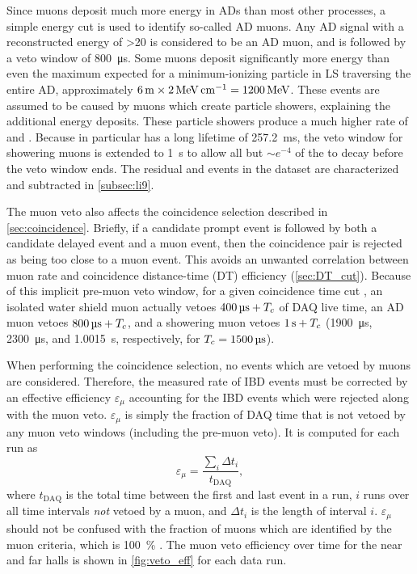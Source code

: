 Since muons deposit much more energy in ADs than most other processes,
a simple energy cut is used to identify so-called AD muons.
Any AD signal with a reconstructed energy of \SI{>20}{\mev}
is considered to be an AD muon, and is followed by a veto window
of \SI{800}{\micro\second}.
Some muons deposit significantly more energy than
even the maximum expected for a minimum-ionizing particle in LS
traversing the entire AD, approximately
$\SI{6}{\meter}\times\SI{2}{\mev\per\cm}=\SI{1200}{\mev}$.
These events are assumed to be caused by muons which create particle showers,
explaining the additional energy deposits.
These particle showers produce a much higher rate of
\li{} and \he{}.
Because \li{} in particular has a long lifetime of \SI{257.2}{\milli\second},
the veto window for showering muons is extended to \SI{1}{\second}
to allow all but $\sim e^{-4}$ of the \li{} to decay before the veto window ends.
The residual \li{} and \he{} events in the dataset are characterized
and subtracted in \cref{subsec:li9}.

The muon veto also affects the coincidence selection
described in \cref{sec:coincidence}.
Briefly, if a candidate prompt event is followed
by both a candidate delayed event and a muon event,
then the coincidence pair is rejected as being too close to a muon event.
This avoids an unwanted correlation between muon rate
and coincidence distance-time (DT) efficiency (\cref{sec:DT_cut}).
Because of this implicit pre-muon veto window,
for a given coincidence time cut \tc,
an isolated water shield muon actually vetoes $\SI{400}{\micro\second}+T_c$
of DAQ live time,
an AD muon vetoes $\SI{800}{\micro\second}+T_c$,
and a showering muon vetoes $\SI{1}{\second}+T_c$
(\SI{1900}{\us}, \SI{2300}{\us}, and \SI{1.0015}{\s}, respectively,
for $\tc=\SI{1500}{\us}$).

When performing the coincidence selection, no events which are vetoed by muons
are considered.
Therefore, the measured rate of IBD events
must be corrected by an effective efficiency $\varepsilon_\mu$
accounting for the IBD events which were rejected along with the muon veto.
$\varepsilon_\mu$ is simply the fraction of DAQ time
that is not vetoed by any muon veto windows (including the pre-muon veto).
It is computed for each run as
\begin{equation}
    \varepsilon_\mu = \frac{\sum_i \Delta t_i}{t_{\text{DAQ}}},
\end{equation}
where $t_{\text{DAQ}}$ is the total time
between the first and last event in a run,
$i$ runs over all time intervals \textit{not} vetoed by a muon,
and $\Delta t_i$ is the length of interval $i$.
$\varepsilon_\mu$ should not be confused
with the fraction of muons which are identified by the muon criteria,
which is \SI{100}{\percent} \cite{muonsystem2015}.
The muon veto efficiency over time for the near and far halls
is shown in \cref{fig:veto_eff} for each data run.

